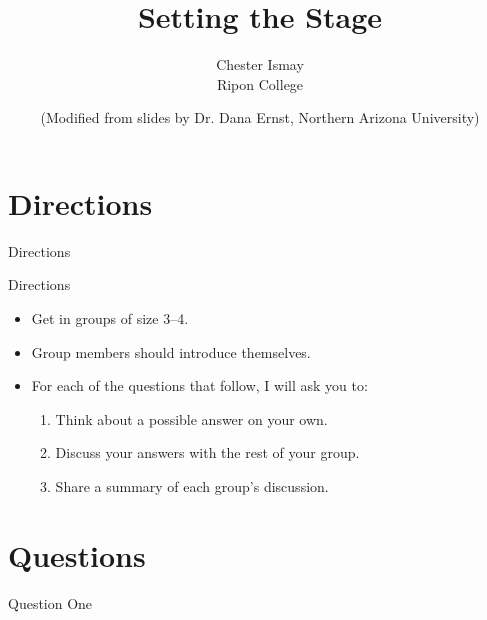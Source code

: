 \documentclass[12pt]{beamer}
\title{Setting the Stage}
\subtitle{}
\author{{\large Chester Ismay}\\
Ripon College}
\date{\vfill \scriptsize{(Modified from slides by Dr. Dana Ernst, Northern Arizona University)}}
\begin{document}

\maketitle


\section{Directions}


\begin{frame}{Directions}

\begin{block}{Directions}
\vspace{-.5em}
\begin{itemize}
\item Get in groups of size 3--4.
\item Group members should introduce themselves.
\item For each of the questions that follow, I will ask you to:
\begin{enumerate}
\item \alert{Think} about a possible answer on your own.
\item \alert{Discuss} your answers with the rest of your group.
\item \alert{Share} a summary of each group's discussion.
\end{enumerate}
\end{itemize}
\end{block}

\end{frame}


\section{Questions}


\begin{frame}{Question One}
\ 


\end{frame}
\end{document}
